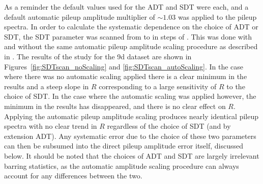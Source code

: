 As a reminder the default values used for the ADT and SDT were  each, and a default automatic pileup amplitude multiplier of $\sim1.03$ was applied to the pileup spectra. In order to calculate the systematic dependence on the choice of ADT or SDT, the SDT parameter was scanned from  to  in steps of . This was done with and without the same automatic pileup amplitude scaling procedure as described in . The results of the study for the 9d dataset are shown in Figures~\ref{fig:SDTscan_noScaling} and \ref{fig:SDTscan_autoScaling}. In the case where there was no automatic scaling applied there is a clear minimum in the \chisq results and a steep slope in $R$ corresponding to a large sensitivity of $R$ to the choice of SDT. In the case where the automatic scaling was applied however, the minimum in the \chisq results has disappeared, and there is no clear effect on $R$. Applying the automatic pileup amplitude scaling produces nearly identical pileup spectra with no clear trend in $R$ regardless of the choice of SDT (and by extension ADT). Any systematic error due to the choice of these two parameters can then be subsumed into the direct pileup amplitude error itself, discussed below. It should be noted that the choices of ADT and SDT are largely irrelevant barring statistics, as the automatic amplitude scaling procedure can always account for any differences between the two. 


